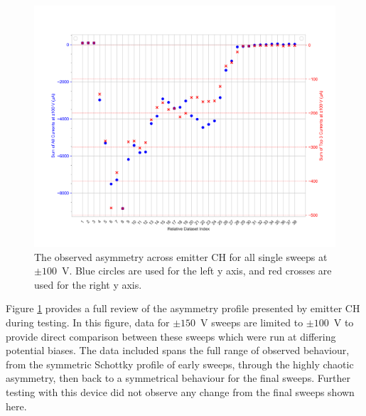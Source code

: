 \begin{refsection}
\begin{figure}[H]
    \centering
    \includegraphics[width=\linewidth]{Chapter7/Figs/Raster/all_asymmetry.png}
    \caption{The observed asymmetry across emitter CH for all single sweeps at $\pm100$~\si{\volt}. Blue circles are used for the left y axis, and red crosses are used for the right y axis.}
    \label{fig:e_ch_all_asymmetry}
\end{figure}

Figure \ref{fig:e_ch_all_asymmetry} provides a full review of the asymmetry profile presented by emitter CH during testing. In this figure, data for $\pm150$~\si{\volt} sweeps are limited to $\pm100$~\si{\volt} to provide direct comparison between these sweeps which were run at differing potential biases. The data included spans the full range of observed behaviour, from the symmetric Schottky profile of early sweeps, through the highly chaotic asymmetry, then back to a symmetrical behaviour for the final sweeps. Further testing with this device did not observe any change from the final sweeps shown here.


\end{refsection}
